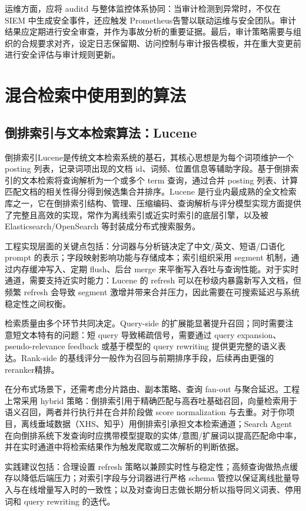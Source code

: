 运维方面，应将 auditd 与整体监控体系协同：当审计检测到异常时，不仅在 SIEM 中生成安全事件，还应触发 Prometheus告警以联动运维与安全团队。审计结果应定期进行安全审查，并作为事故分析的重要证据。最后，审计策略需要与组织的合规要求对齐，设定日志保留期、访问控制与审计报告模板，并在重大变更前进行安全评估与审计规则更新。
\section{混合检索中使用到的算法} 
\subsection{倒排索引与文本检索算法：Lucene}
倒排索引Lucene\cite{Portero2021Lucene}是传统文本检索系统的基石，其核心思想是为每个词项维护一个 posting 列表，记录词项出现的文档 id、词频、位置信息等辅助字段。基于倒排索引的文本检索将查询解析为一个或多个 term 查询，通过合并 posting 列表、计算匹配文档的相关性得分得到候选集合并排序。Lucene 是行业内最成熟的全文检索库之一，它在倒排索引结构、管理、压缩编码、查询解析与评分模型实现方面提供了完整且高效的实现，常作为离线索引或近实时索引的底层引擎，以及被 Elasticsearch/OpenSearch 等封装成分布式搜索服务。

工程实现层面的关键点包括：分词器与分析链决定了中文/英文、短语/口语化 prompt 的表示；字段映射影响功能与存储成本；索引组织采用 segment 机制，通过内存缓冲写入、定期 flush、后台 merge 来平衡写入吞吐与查询性能。对于实时通道，需要支持近实时能力：Lucene 的 refresh 可以在秒级内暴露新写入文档，但频繁 refresh 会导致 segment 激增并带来合并压力，因此需要在可搜索延迟与系统稳定性之间权衡。

检索质量由多个环节共同决定。Query-side 的扩展能显著提升召回；同时需要注意短文本特有的问题：短 query 导致稀疏信号，需要通过 query expansion、pseudo-relevance feedback 或基于模型的 query rewriting 提供更完整的语义表达。Rank-side 的基线评分一般作为召回与前期排序手段，后续再由更强的 reranker精排。

在分布式场景下，还需考虑分片路由、副本策略、查询 fan-out 与聚合延迟。工程上常采用 hybrid 策略：倒排索引用于精确匹配与高吞吐基础召回，向量检索用于语义召回，两者并行执行并在合并阶段做 score normalization 与去重。对于你项目，离线垂域数据（XHS、知乎）用倒排索引承担文本检索通道；Search Agent 在向倒排系统下发查询时应携带模型提取的实体/意图/扩展词以提高匹配命中率，并在实时通道中将检索结果作为触发爬取或二次解析的判断依据。

实践建议包括：合理设置 refresh 策略以兼顾实时性与稳定性；高频查询做热点缓存以降低后端压力；对索引字段与分词器进行严格 schema 管控以保证离线批量导入与在线增量写入时的一致性；以及对查询日志做长期分析以指导同义词表、停用词和 query rewriting 的迭代。

